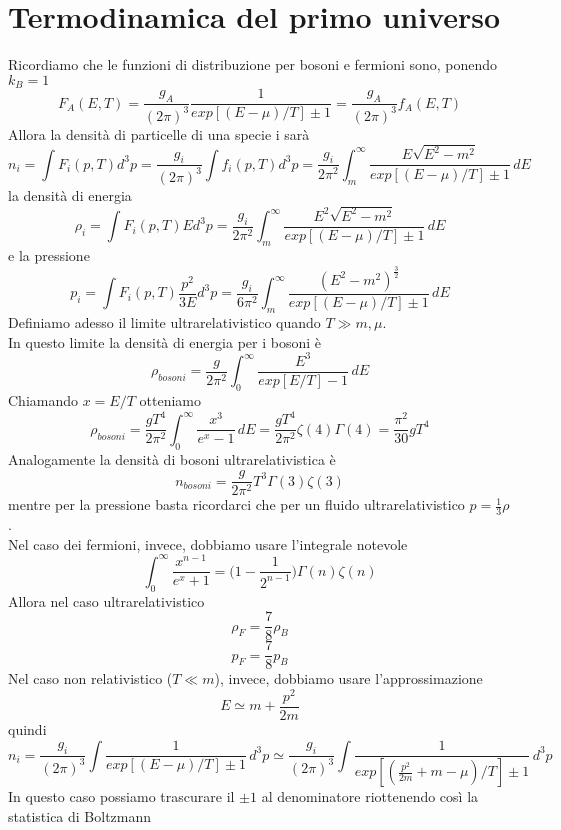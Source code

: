 \documentclass[10pt,a4paper]{article}
\let\oldmarginpar\marginpar
\renewcommand\marginpar[1]{\-\oldmarginpar[\raggedleft\footnotesize #1]%
	{\raggedright\footnotesize #1}}
\theoremstyle{break}
\theoremstyle{remark}
\theoremstyle{definition}
\begin{document}
\section{Termodinamica del primo universo}
Ricordiamo che le funzioni di distribuzione per bosoni e fermioni sono, ponendo $k_B=1$
\[
F_A (E, T) = \frac{g_A}{(2 \pi)^3} \frac{1}{exp[(E - \mu)/T] \pm 1} =  \frac{g_A}{(2 \pi)^3} f_A(E, T)
\]
Allora la densità di particelle di una specie i sarà 
\[
\boxed{
n_i = \int F_i(p, T) d^3p =  \frac{g_i}{(2 \pi)^3} \int f_i(p, T) d^3 p =  \frac{g_i}{2 \pi^2} \int_{m}^{\infty}   \frac{E \sqrt{E^2 - m^2}}{exp[(E - \mu)/T] \pm 1}\, dE
}
\]
la densità di energia
\[
\boxed{\rho_i = \int F_i(p, T) E d^3p = \frac{g_i}{2 \pi^2} \int_{m}^{\infty}   \frac{E^2 \sqrt{E^2 - m^2}}{exp[(E - \mu)/T] \pm 1}\, dE}
\]
e la pressione
\[
\boxed{p_i = \int F_i(p, T) \frac{p^2}{3E} d^3p = \frac{g_i}{6 \pi^2} \int_{m}^{\infty}   \frac{ (E^2 - m^2)^\frac32}{exp[(E - \mu)/T] \pm 1}\, dE}
\]
Definiamo adesso il limite ultrarelativistico quando $T \gg m , \mu$.
\\
In questo limite la densità di energia per i bosoni è 
\[
\rho_{bosoni} = \frac{g}{2 \pi^2} \int_{0}^{\infty}   \frac{E^3}{exp[E/T] - 1}\, dE
\]
Chiamando $x = E/T$ otteniamo
\marginpar{$$\int_{0}^{\infty} \frac{x^{n-1}}{e^x - 1} = \zeta(n) \Gamma(n)$$}
\marginpar{$$\zeta(2) = \frac{\pi^2}{6}$$ \\ $$\zeta(4) = \frac{\pi^4}{90}$$ \\ $$\zeta(6) = \frac{\pi^6}{945}$$}
\[
\rho_{bosoni} = \frac{g T^4}{2 \pi^2} \int_{0}^{\infty}   \frac{x^3}{e^x - 1}\, dE =  \frac{g T^4}{2 \pi^2} \zeta(4) \Gamma(4) = \frac{\pi^2}{30}g T^4
\]
Analogamente la densità di bosoni ultrarelativistica è
\[
n_{bosoni} = \frac{g}{2 \pi^2} T^3 \Gamma(3) \zeta(3)
\]
mentre per la pressione basta ricordarci che per un fluido ultrarelativistico $p = \frac13 \rho$.\\
Nel caso dei fermioni, invece, dobbiamo usare l'integrale notevole
\[
\int_{0}^{\infty} \frac{x^{n-1}}{e^x + 1} = \bigg(1 - \frac{1}{2^{n-1}}\bigg) \Gamma(n)\zeta(n)
\]
Allora nel caso ultrarelativistico
\[
\rho_F = \frac78 \rho_B 
\]
\[
p_F = \frac78 p_B
\]
Nel caso non relativistico ($T \ll m$), invece, dobbiamo usare l'approssimazione 
\[
E \simeq m + \frac{p^2}{2m}
\]
quindi
\[
n_i = \frac{g_i}{(2 \pi)^3} \int \frac{1}{exp[(E - \mu)/T]\pm 1} \, d^3p \simeq \frac{g_i}{(2 \pi)^3} \int \frac{1}{exp[(\frac{p^2}{2m} + m - \mu)/T]\pm 1} \, d^3p  
\]
In questo caso possiamo trascurare il $\pm 1$ al denominatore riottenendo così la statistica di Boltzmann 
\end{document}
